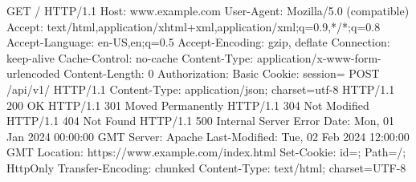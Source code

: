 {\footnotesize
\begin{verbatim*}
GET / HTTP/1.1
Host: www.example.com
User-Agent: Mozilla/5.0 (compatible)
Accept: text/html,application/xhtml+xml,application/xml;q=0.9,*/*;q=0.8
Accept-Language: en-US,en;q=0.5
Accept-Encoding: gzip, deflate
Connection: keep-alive
Cache-Control: no-cache
Content-Type: application/x-www-form-urlencoded
Content-Length: 0
Authorization: Basic 
Cookie: session=
POST /api/v1/ HTTP/1.1
Content-Type: application/json; charset=utf-8
HTTP/1.1 200 OK
HTTP/1.1 301 Moved Permanently
HTTP/1.1 304 Not Modified
HTTP/1.1 404 Not Found
HTTP/1.1 500 Internal Server Error
Date: Mon, 01 Jan 2024 00:00:00 GMT
Server: Apache
Last-Modified: Tue, 02 Feb 2024 12:00:00 GMT
Location: https://www.example.com/index.html
Set-Cookie: id=; Path=/; HttpOnly
Transfer-Encoding: chunked
Content-Type: text/html; charset=UTF-8


\end{verbatim*}}
